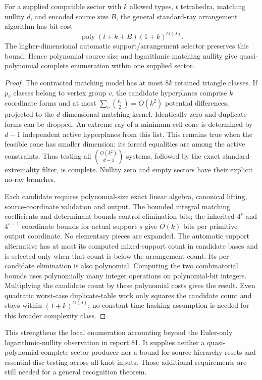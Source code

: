 \begin{proposition}
For a supplied compatible sector with $k$ allowed types, $t$ tetrahedra,
matching nullity $d$, and encoded source size $B$, the general standard-ray
arrangement algorithm has bit cost
\[
 \operatorname{poly}(t+k+B)(1+k)^{O(d)}.
\]
The higher-dimensional automatic support/arrangement selector preserves
this bound. Hence polynomial source size and logarithmic matching nullity
give quasi-polynomial complete enumeration within one supplied sector.
\end{proposition}
\begin{proof}
The contracted matching model has at most $8k$ retained triangle classes.
If $p_v$ classes belong to vertex group $v$, the candidate hyperplanes
comprise $k$ coordinate forms and at most $\sum_v\binom{p_v}{2}=O(k^2)$
potential differences, projected to the $d$-dimensional matching kernel.
Identically zero and duplicate forms can be dropped. An extreme ray of a
minimum-cell cone is determined by $d-1$ independent active hyperplanes
from this list. This remains true when the feasible cone has smaller
dimension: its forced equalities are among the active constraints.
Thus testing all $\binom{O(k^2)}{d-1}$ systems, followed by the exact
standard-extremality filter, is complete. Nullity zero and empty sectors
have their explicit no-ray branches.

Each candidate requires polynomial-size exact linear algebra, canonical
lifting, source-coordinate validation and output. The bounded integral
matching coefficients and determinant bounds control elimination bits;
the inherited $4^s$ and $4^{s-1}$ coordinate bounds for actual support $s$
give $O(k)$ bits per primitive output coordinate. No elementary pieces
are expanded. The automatic support alternative has at most its computed
mixed-support count in candidate bases and is selected only when that
count is below the arrangement count. Its per-candidate elimination is
also polynomial. Computing the two combinatorial bounds uses polynomially
many integer operations on polynomial-bit integers. Multiplying the
candidate count by these polynomial costs gives the result.
Even quadratic worst-case duplicate-table work only squares the candidate
count and stays within $(1+k)^{O(d)}$; no constant-time hashing assumption
is needed for this broader complexity class.
\end{proof}

This strengthens the local enumeration accounting beyond the Euler-only
logarithmic-nullity observation in report 81. It supplies neither a
quasi-polynomial complete sector producer nor a bound for source hierarchy
resets and essential-disc testing across all knot inputs. Those additional
requirements are still needed for a general recognition theorem.

